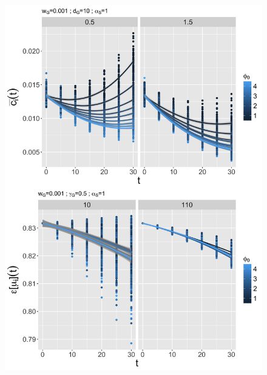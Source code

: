 \begin{figure}
\includegraphics[width=\linewidth,height=0.9\textheight]{Figures/Final/6-2-2-fig-macrocoevol-behavior-time.jpg}

\end{figure}

